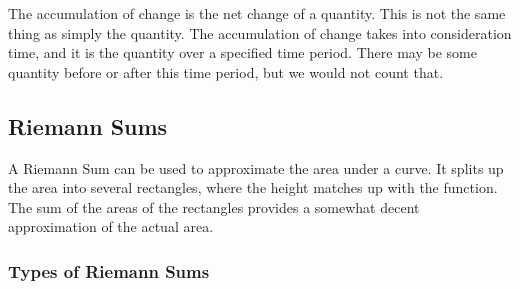 \documentclass[12pt]{article}
\begin{document}
The accumulation of change is the net change of a quantity. This is not the same thing as simply the quantity. The accumulation of change takes into consideration time, and it is the quantity over a specified time period. There may be some quantity before or after this time period, but we would not count that.

\subsection{Riemann Sums}
A Riemann Sum can be used to approximate the area under a curve. It splits up the area into several rectangles, where the height matches up with the function. The sum of the areas of the rectangles provides a somewhat decent approximation of the actual area.

\subsubsection{Types of Riemann Sums}
\end{document}
